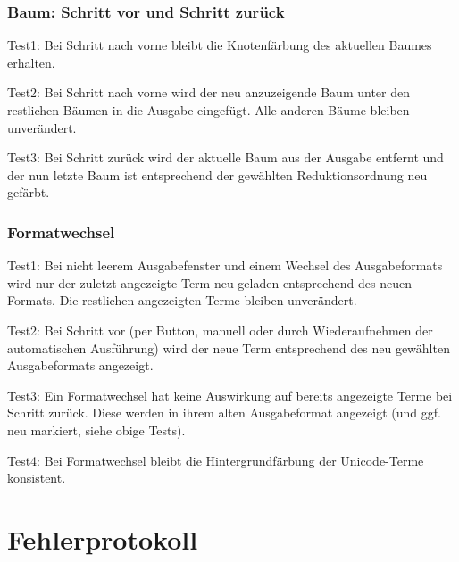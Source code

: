 \documentclass[parskip=full,11pt,openany]{scrreprt}
\begin{document}
\subsection{Baum: Schritt vor und Schritt zurück}
Test1: Bei Schritt nach vorne bleibt die Knotenfärbung des aktuellen Baumes erhalten.

Test2: Bei Schritt nach vorne wird der neu anzuzeigende Baum unter den restlichen Bäumen in die Ausgabe eingefügt. Alle anderen Bäume bleiben unverändert.

Test3: Bei Schritt zurück wird der aktuelle Baum aus der Ausgabe entfernt und der nun letzte Baum ist entsprechend der gewählten Reduktionsordnung neu gefärbt.

\subsection{Formatwechsel}
Test1: Bei nicht leerem Ausgabefenster und einem Wechsel des Ausgabeformats wird nur der zuletzt angezeigte Term neu geladen entsprechend des neuen Formats. Die restlichen angezeigten Terme bleiben unverändert.

Test2: Bei Schritt vor (per Button, manuell oder durch Wiederaufnehmen der automatischen Ausführung) wird der neue Term entsprechend des neu gewählten Ausgabeformats angezeigt. 

Test3: Ein Formatwechsel hat keine Auswirkung auf bereits angezeigte Terme bei Schritt zurück. Diese werden in ihrem alten Ausgabeformat angezeigt (und ggf. neu markiert, siehe obige Tests).

Test4: Bei Formatwechsel bleibt die Hintergrundfärbung der Unicode-Terme konsistent. %



\chapter{Fehlerprotokoll}
\end{document}
